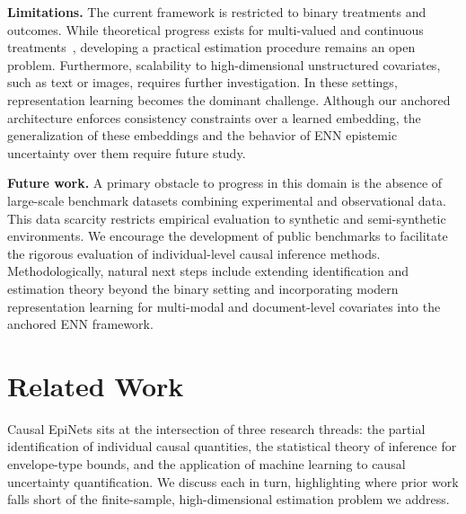 \documentclass[accepted]{uai2026} %
\theoremstyle{plain}
\theoremstyle{definition}
\theoremstyle{remark}
\begin{document}
\textbf{Limitations.} The current framework is restricted to binary treatments 
and outcomes. While theoretical progress exists for multi-valued and continuous 
treatments~\citep{kawakami24a, li2024probabilities_nonbinary}, developing a 
practical estimation procedure remains an open problem. 
Furthermore, scalability to high-dimensional unstructured covariates, such as 
text or images, requires further investigation. In these settings, representation 
learning becomes the dominant challenge. Although our anchored architecture 
enforces consistency constraints over a learned embedding, the generalization of 
these embeddings and the behavior of ENN epistemic uncertainty over them require 
future study.

\textbf{Future work.} A primary obstacle to progress in this domain is the absence of 
large-scale benchmark datasets combining experimental and observational data. This 
data scarcity restricts empirical evaluation to synthetic and semi-synthetic environments. 
We encourage the development of public benchmarks to facilitate the rigorous evaluation 
of individual-level causal inference methods. Methodologically, natural next steps 
include extending identification and estimation theory beyond the binary setting 
and incorporating modern representation learning for multi-modal and document-level 
covariates into the anchored ENN framework.

\newpage


\newpage
\appendix
\onecolumn

\section{Related Work} \label{app:related-work}

Causal EpiNets sits at the intersection of three research threads: the
partial identification of individual causal quantities, the statistical
theory of inference for envelope-type bounds, and the application of
machine learning to causal uncertainty quantification. We discuss each
in turn, highlighting where prior work falls short of the finite-sample,
high-dimensional estimation problem we address.
\end{document}
